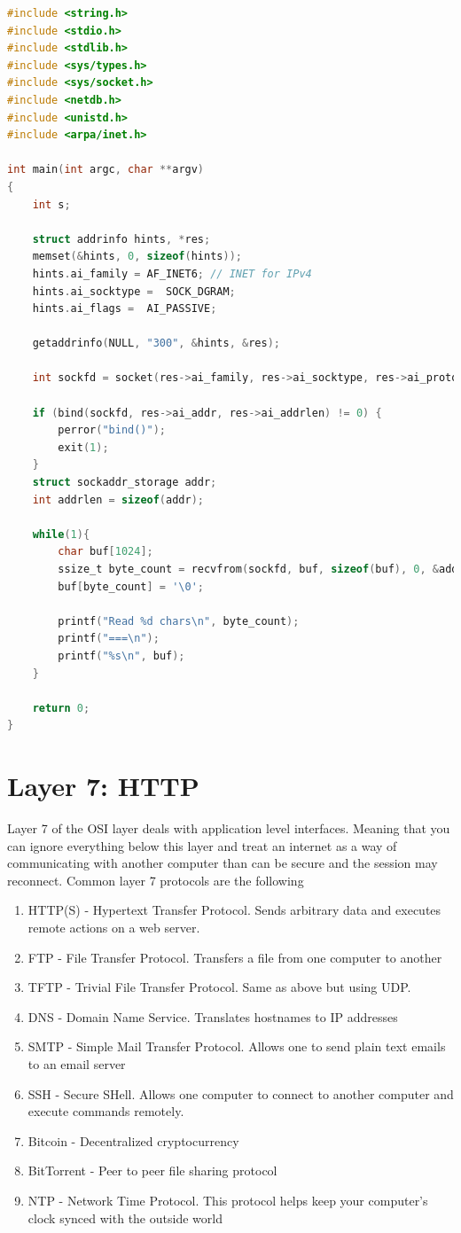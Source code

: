 \begin{lstlisting}[language=C]
#include <string.h>
#include <stdio.h>
#include <stdlib.h>
#include <sys/types.h>
#include <sys/socket.h>
#include <netdb.h>
#include <unistd.h>
#include <arpa/inet.h>

int main(int argc, char **argv)
{
    int s;

    struct addrinfo hints, *res;
    memset(&hints, 0, sizeof(hints));
    hints.ai_family = AF_INET6; // INET for IPv4
    hints.ai_socktype =  SOCK_DGRAM;
    hints.ai_flags =  AI_PASSIVE;

    getaddrinfo(NULL, "300", &hints, &res);

    int sockfd = socket(res->ai_family, res->ai_socktype, res->ai_protocol);

    if (bind(sockfd, res->ai_addr, res->ai_addrlen) != 0) {
        perror("bind()");
        exit(1);
    }
    struct sockaddr_storage addr;
    int addrlen = sizeof(addr);

    while(1){
        char buf[1024];
        ssize_t byte_count = recvfrom(sockfd, buf, sizeof(buf), 0, &addr, &addrlen);
        buf[byte_count] = '\0';

        printf("Read %d chars\n", byte_count);
        printf("===\n");
        printf("%s\n", buf);
    }

    return 0;
}
\end{lstlisting}


\section{Layer 7: HTTP}

Layer 7 of the OSI layer deals with application level interfaces.
Meaning that you can ignore everything below this layer and treat an internet as a way of communicating with another computer than can be secure and the session may reconnect.
Common layer 7 protocols are the following

\begin{enumerate}
  \item HTTP(S) - Hypertext Transfer Protocol.
    Sends arbitrary data and executes remote actions on a web server.
  \item FTP - File Transfer Protocol.
    Transfers a file from one computer to another
  \item TFTP - Trivial File Transfer Protocol.
    Same as above but using UDP.
  \item DNS - Domain Name Service.
    Translates hostnames to IP addresses
  \item SMTP - Simple Mail Transfer Protocol.
    Allows one to send plain text emails to an email server
  \item SSH - Secure SHell.
    Allows one computer to connect to another computer and execute commands remotely.
  \item Bitcoin - Decentralized cryptocurrency
  \item BitTorrent - Peer to peer file sharing protocol
  \item NTP - Network Time Protocol.
    This protocol helps keep your computer's clock synced with the outside world
\end{enumerate}

